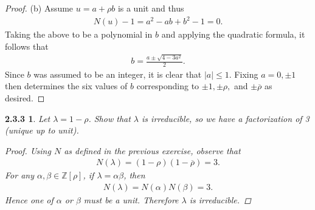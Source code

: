 \documentclass[10pt]{amsart}
\begin{document}
\begin{3}
\begin{proof}
    (b) Assume \(u = a + {\rho}b\) is a unit and thus
    \begin{align*}
      N(u) - 1 = a^2 - ab + b^2 - 1 = 0.
    \end{align*}
    Taking the above to be a polynomial in \(b\) and applying the quadratic formula, it follows that
    \begin{align*}
      b = \frac{a \pm \sqrt{4 - 3a^2}}{2}.
    \end{align*}
    Since \(b\) was assumed to be an integer, it is clear that \(|a| \leq 1\).
    Fixing \(a = 0, \pm 1\) then determines the six values of \(b\) corresponding to \(\pm 1, \pm \rho,\) and \(\pm \overline{\rho}\) as desired.
  \end{proof}
\end{3}

\newpage

\newtheorem*{4}{2.3.3}
\begin{4}
  Let \(\lambda = 1 - \rho\).  
  Show that \(\lambda\) is irreducible, so we have a factorization of 3 (unique up to unit).
  \begin{proof}
    Using \(N\) as defined in the previous exercise, observe that 
    \begin{align*}
      N(\lambda) = (1 - \rho)(1 - \overline{\rho}) = 3.
    \end{align*}
    For any \(\alpha,\beta \in \mathbb{Z}[\rho]\), if \(\lambda = \alpha\beta\), then 
    \begin{align*}
      N(\lambda) = N(\alpha)N(\beta) = 3.
    \end{align*}
    Hence one of \(\alpha\) or \(\beta\) must be a unit.
    Therefore \(\lambda\) is irreducible.
  \end{proof}
\end{4}
\end{document}
